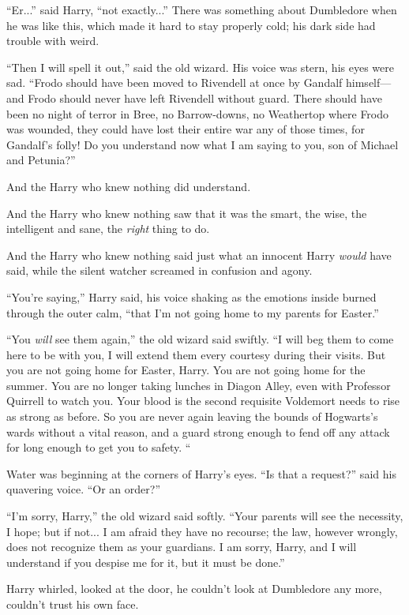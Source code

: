 “Er...” said Harry, “not exactly...” There was something about Dumbledore when he was like this, which made it hard to stay properly cold; his dark side had trouble with weird.

“Then I will spell it out,” said the old wizard. His voice was stern, his eyes were sad. “Frodo should have been moved to Rivendell at once by Gandalf himself—and Frodo should never have left Rivendell without guard. There should have been no night of terror in Bree, no Barrow-downs, no Weathertop where Frodo was wounded, they could have lost their entire war any of those times, for Gandalf’s folly! Do you understand now what I am saying to you, son of Michael and Petunia?”

And the Harry who knew nothing did understand.

And the Harry who knew nothing saw that it was the smart, the wise, the intelligent and sane, the \emph{right} thing to do.

And the Harry who knew nothing said just what an innocent Harry \emph{would} have said, while the silent watcher screamed in confusion and agony.

“You’re saying,” Harry said, his voice shaking as the emotions inside burned through the outer calm, “that I’m not going home to my parents for Easter.”

“You \emph{will} see them again,” the old wizard said swiftly. “I will beg them to come here to be with you, I will extend them every courtesy during their visits. But you are not going home for Easter, Harry. You are not going home for the summer. You are no longer taking lunches in Diagon Alley, even with Professor Quirrell to watch you. Your blood is the second requisite Voldemort needs to rise as strong as before. So you are never again leaving the bounds of Hogwarts’s wards without a vital reason, and a guard strong enough to fend off any attack for long enough to get you to safety. “

Water was beginning at the corners of Harry’s eyes. “Is that a request?” said his quavering voice. “Or an order?”

“I’m sorry, Harry,” the old wizard said softly. “Your parents will see the necessity, I hope; but if not... I am afraid they have no recourse; the law, however wrongly, does not recognize them as your guardians. I am sorry, Harry, and I will understand if you despise me for it, but it must be done.”

Harry whirled, looked at the door, he couldn’t look at Dumbledore any more, couldn’t trust his own face.

